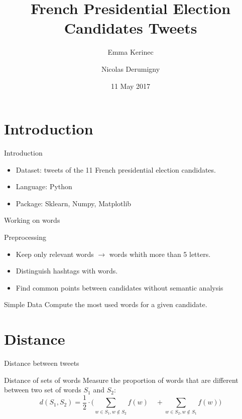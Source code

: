 \documentclass{beamer}
\title[DM-Project 2]{French Presidential Election Candidates Tweets}
\author[E. Kerinec and N. Derumigny]{Emma Kerinec \and Nicolas Derumigny}
\institute[]{ENS Lyon}
\date{11 May 2017}
\begin{document}
\begin{frame}
	\titlepage
	\begin{center}
	\end{center}
\end{frame}



\section{Introduction}
\begin{frame}{Introduction}
\begin{itemize}
\item Dataset: tweets of the 11 French presidential election candidates.
\item Language: Python
\item Package: Sklearn, Numpy, Matplotlib
\end{itemize}

\end{frame}

\begin{frame}{Working on words}
\begin{block}{Preprocessing}
\begin{itemize}
\item Keep only relevant words $\to$ words whith more than 5 letters.
\item Distinguish hashtags with words.
\item Find common points between candidates without semantic analysis
\end{itemize}
\end{block}
\end{frame}

\begin{frame}{Simple Data}
Compute the most used words for a given candidate.
\end{frame}


\section{Distance}
\begin{frame}{Distance between tweets}
\begin{block}{Distance of sets of words}
Measure the proportion of words that are different between two set of words $S_1$ and $S_2$:
\[
d(S_1, S_2)= \frac{1}{2} \cdot \Big( \sum_{w \in S_1, w \notin S_2}f(w) \quad + \sum_{w \in S_2, w \notin S_1} f(w) \Big) 
\]
\end{block}
\end{frame}
\end{document}
